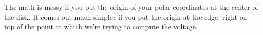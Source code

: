 The math is messy if you put the origin of your polar coordinates  
at the center of the disk. It comes out much simpler
if you put the origin at the edge, right on top of the point at
which we're trying to compute the voltage.
